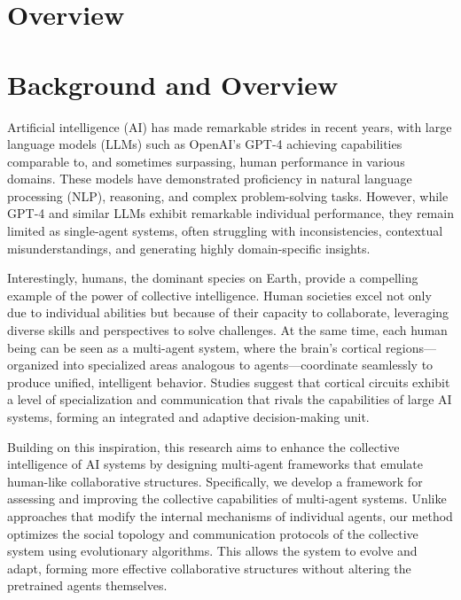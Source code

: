 
\section{Overview}
\label{sec:overview}
\section*{Background and Overview}

Artificial intelligence (AI) has made remarkable strides in recent years, with large language models (LLMs) such as OpenAI’s GPT-4 achieving capabilities comparable to, and sometimes surpassing, human performance in various domains. These models have demonstrated proficiency in natural language processing (NLP), reasoning, and complex problem-solving tasks. However, while GPT-4 and similar LLMs exhibit remarkable individual performance, they remain limited as single-agent systems, often struggling with inconsistencies, contextual misunderstandings, and generating highly domain-specific insights.

Interestingly, humans, the dominant species on Earth, provide a compelling example of the power of collective intelligence. \cite{mountcastle1997columnar} Human societies excel not only due to individual abilities but because of their capacity to collaborate, leveraging diverse skills and perspectives to solve challenges. At the same time, each human being can be seen as a multi-agent system, where the brain's cortical regions—organized into specialized areas analogous to agents—coordinate seamlessly to produce unified, intelligent behavior. Studies suggest that cortical circuits exhibit a level of specialization and communication that rivals the capabilities of large AI systems, forming an integrated and adaptive decision-making unit. \cite{mountcastle1997columnar}\cite{tononi1998consciousness}

Building on this inspiration, this research aims to enhance the collective intelligence of AI systems by designing multi-agent frameworks that emulate human-like collaborative structures. Specifically, we develop a framework for assessing and improving the collective capabilities of multi-agent systems. Unlike approaches that modify the internal mechanisms of individual agents, our method optimizes the social topology and communication protocols of the collective system using evolutionary algorithms. This allows the system to evolve and adapt, forming more effective collaborative structures without altering the pretrained agents themselves.

